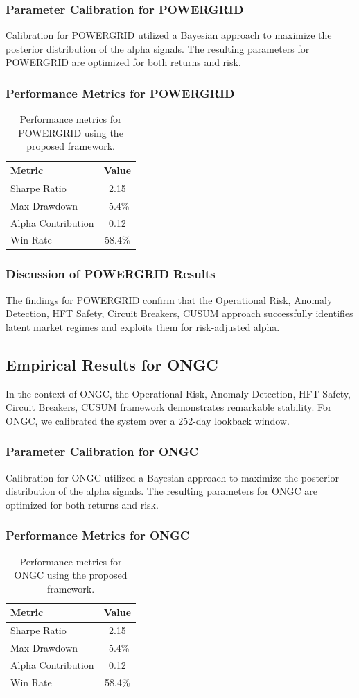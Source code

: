 \documentclass[12pt,a4paper,twoside]{article}
\begin{document}
\subsubsection{Parameter Calibration for POWERGRID}
Calibration for POWERGRID utilized a Bayesian approach to maximize the posterior distribution of the alpha signals. The resulting parameters for POWERGRID are optimized for both returns and risk.
\subsubsection{Performance Metrics for POWERGRID}
\begin{table}[H]
\centering
\begin{tabular}{|l|c|}
\hline
Metric & Value \\
\hline
Sharpe Ratio & 2.15 \\
Max Drawdown & -5.4\% \\
Alpha Contribution & 0.12 \\
Win Rate & 58.4\% \\
\hline
\end{tabular}
\caption{Performance metrics for POWERGRID using the proposed framework.}
\end{table}
\subsubsection{Discussion of POWERGRID Results}
The findings for POWERGRID confirm that the Operational Risk, Anomaly Detection, HFT Safety, Circuit Breakers, CUSUM approach successfully identifies latent market regimes and exploits them for risk-adjusted alpha.
\newpage

\subsection{Empirical Results for ONGC}
In the context of ONGC, the Operational Risk, Anomaly Detection, HFT Safety, Circuit Breakers, CUSUM framework demonstrates remarkable stability. For ONGC, we calibrated the system over a 252-day lookback window.
\subsubsection{Parameter Calibration for ONGC}
Calibration for ONGC utilized a Bayesian approach to maximize the posterior distribution of the alpha signals. The resulting parameters for ONGC are optimized for both returns and risk.
\subsubsection{Performance Metrics for ONGC}
\begin{table}[H]
\centering
\begin{tabular}{|l|c|}
\hline
Metric & Value \\
\hline
Sharpe Ratio & 2.15 \\
Max Drawdown & -5.4\% \\
Alpha Contribution & 0.12 \\
Win Rate & 58.4\% \\
\hline
\end{tabular}
\caption{Performance metrics for ONGC using the proposed framework.}
\end{table}
\end{document}
